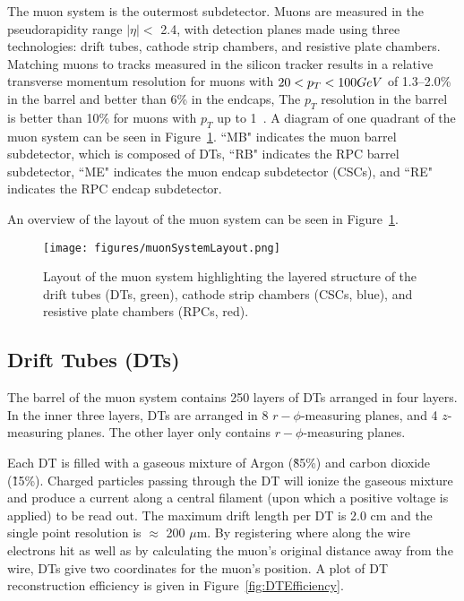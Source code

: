 The muon system is the outermost subdetector. Muons are measured in the pseudorapidity range $|\eta| <$ 2.4, with detection planes made using three technologies: drift tubes, cathode strip chambers, and resistive plate chambers. Matching muons to tracks measured in the silicon tracker results in a relative transverse momentum resolution for muons with $20 < p_T < 100 GeV$ of 1.3--2.0\% in the barrel and better than 6\% in the endcaps, The $p_T$ resolution in the barrel is better than 10\% for muons with $p_T$ up to 1\TeV~\cite{Chatrchyan:2012xi}. A diagram of one quadrant of the muon system can be seen in Figure~\ref{fig:muonSystemLayout}. ``MB" indicates the muon barrel subdetector, which is composed of DTs, ``RB" indicates the RPC barrel subdetector, ``ME" indicates the muon endcap subdetector (CSCs), and ``RE" indicates the RPC endcap subdetector. 

An overview of the layout of the muon system can be seen in Figure~\ref{fig:muonSystemLayout}.

\begin{figure}\centering
  \texttt{[image: figures/muonSystemLayout.png]}
  \caption{\label{fig:muonSystemLayout} Layout of the muon system highlighting the layered structure of the drift tubes (DTs, green), cathode strip chambers (CSCs, blue), and resistive plate chambers (RPCs, red).}
\end{figure}

\subsection{Drift Tubes (DTs)}

The barrel of the muon system contains 250 layers of DTs arranged in four layers. In the inner three layers, DTs are arranged in 8 $r-\phi$-measuring planes, and 4 $z$-measuring planes. The other layer only contains $r-\phi$-measuring planes.

Each DT is filled with a gaseous mixture of Argon (\~85\%) and carbon dioxide (\~15\%). Charged particles passing through the DT will ionize the gaseous mixture and produce a current along a central filament (upon which a positive voltage is applied) to be read out. The maximum drift length per DT is 2.0 cm and the single point resolution is $\approx$ 200 $\mu$m. By registering where along the wire electrons hit as well as by calculating the muon's original distance away from the wire, DTs give two coordinates for the muon’s position. A plot of DT reconstruction efficiency is given in Figure~\ref{fig:DTEfficiency}.\cite{TDR}

